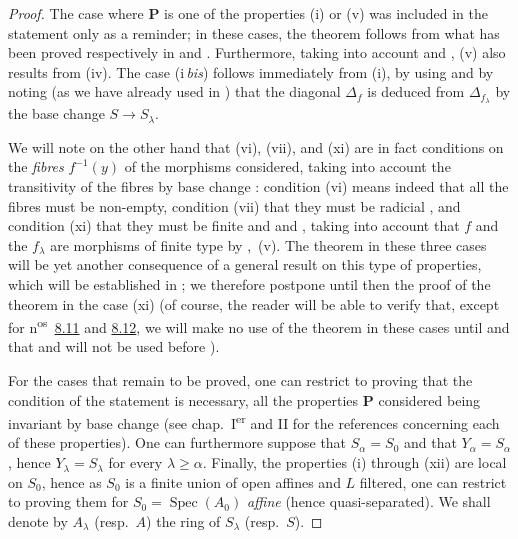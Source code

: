 \begin{proof}
The case where $\mathbf{P}$ is one of the properties (i) or (v) was included in the statement only as a reminder; in these cases, the theorem follows from what has been proved respectively in  and .
Furthermore, taking into account  and , (v) also results from (iv).
The case (i\,\emph{bis}) follows immediately from (i), by using  and by noting (as we have already used in ) that the diagonal $\Delta_f$ is deduced from $\Delta_{f_\lambda}$ by the base change $S\to S_\lambda$.

We will note on the other hand that (vi), (vii), and (xi) are in fact conditions on the \emph{fibres} $f^{-1}(y)$ of the morphisms considered, taking into account the transitivity of the fibres by base change : condition (vi) means indeed that all the fibres must be non-empty, condition (vii) that they must be radicial , and condition (xi) that they must be finite  and  and , taking into account that $f$ and the $f_\lambda$ are morphisms of finite type by ,~(v).
The theorem in these three cases will be yet another consequence of a general result on this type of properties, which will be established in ; we therefore postpone until then the proof of the theorem in the case (xi) (of course, the reader will be able to verify that, except for n\textsuperscript{os}~{\hyperlink{ega4.c04.subsec.8-11}{8.11}} and {\hyperlink{ega4.c04.subsec.8-12}{8.12}}, we will make no use of the theorem in these cases until  and that  and  will not be used before ).

For the cases that remain to be proved, one can restrict to proving that the condition of the statement is necessary, all the properties $\mathbf{P}$ considered being invariant by base change (see chap.~I\textsuperscript{er} and II for the references concerning each of these properties).
One can furthermore suppose that $S_\alpha=S_0$ and that $Y_\alpha=S_\alpha$, hence $Y_\lambda=S_\lambda$ for every $\lambda\geqslant\alpha$.
Finally, the properties (i) through (xii) are local on $S_0$, hence as $S_0$ is a finite union of open affines and $L$ filtered, one can restrict to proving them for $S_0=\operatorname{Spec}(A_0)$ \emph{affine} (hence quasi-separated).
We shall denote by $A_\lambda$ (resp.\ $A$) the ring of $S_\lambda$ (resp.\ $S$).


\end{proof}
